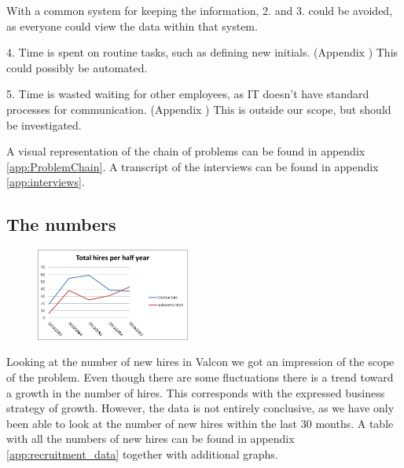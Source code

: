 With a common system for keeping the information, 2. and 3. could be avoided, as everyone could view the data within that system.

4. Time is spent on routine tasks, such as defining new initials.
(Appendix )
This could possibly be automated.

5. Time is wasted waiting for other employees, as IT doesn't have standard processes for communication.
(Appendix )
This is outside our scope, but should be investigated.

A visual representation of the chain of problems can be found in appendix \ref{app:ProblemChain}.
A transcript of the interviews can be found in appendix \ref{app:interviews}.

\subsection{The numbers}
\begin{figure}
\vspace{-20pt}
\centering
\includegraphics[width=0.45\textwidth]{appendix/total_hires_per_half_year.png}
\label{fig:total_hires_per_half_year}
\end{figure}
Looking at the number of new hires in Valcon we got an impression of the scope of the problem.
Even though there are some fluctuations there is a trend toward a growth in the number of hires.
This corresponds with the expressed business strategy of growth.
However, the data is not entirely conclusive, as we have only been able to look at the number of new hires within the last 30 months.
A table with all the numbers of new hires can be found in appendix \ref{app:recruitment_data} together with additional graphs.